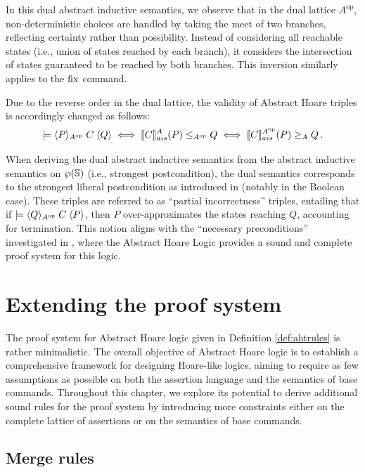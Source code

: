 \documentclass[
  10pt,       %
  twoside,    %
  a4paper,    %
  english,    %
  tikz,       %
  openright,  %
]{book}
\begin{document}
In this dual abstract inductive semantics, we observe that in the
dual lattice \( A^{\mathrm{op}} \), non-deterministic choices are handled by taking the
meet of two branches, reflecting certainty rather than possibility. Instead of
considering all reachable states (i.e., union of states reached by each branch), it
considers the intersection of states guaranteed to be reached by both branches.
This inversion similarly applies to the \( \fix \) command.

Due to the reverse order in the dual lattice, the validity of Abstract Hoare
triples is accordingly changed as follows:
$$\models \atriple[A^{\mathrm{op}}]{P}{C}{Q} \iff \asem{C}(P) \leq_{A^{\mathrm{op}}} Q \iff \asem[A^{\mathrm{op}}]{C}(P) \geq_A Q\, .$$

When deriving the dual abstract inductive semantics from the abstract
inductive semantics on \( \pow{\states} \) (i.e., strongest postcondition), the dual
semantics corresponds to the strongest liberal postcondition as introduced in
\cite{Zhang22} (notably in the Boolean case). These triples are referred to as ``partial
incorrectness'' triples, entailing that if \( \models \atriple[A^{\mathrm{op}}]{Q}{C}{P} \), then
\( P \) over-approximates the states reaching \( Q \), accounting for
termination. This notion aligns with the ``necessary preconditions'' investigated in
\cite{Cousot13}, where the Abstract Hoare Logic provides a sound and complete
proof system for this logic.

\chapter{Extending the proof system}

The proof system for Abstract Hoare logic given in Definition \ref{def:ahtrules} is
rather minimalistic. The overall objective of Abstract Hoare logic is to establish a
comprehensive framework for designing Hoare-like logics, aiming to require as
few assumptions as possible on both the assertion language and the semantics of
base commands. Throughout this chapter, we explore its potential to derive
additional sound rules for the proof system by introducing more constraints
either on the complete lattice of assertions or on the semantics of base commands.

\section{Merge rules}
\label{chp:join-meet-rules}
\end{document}
